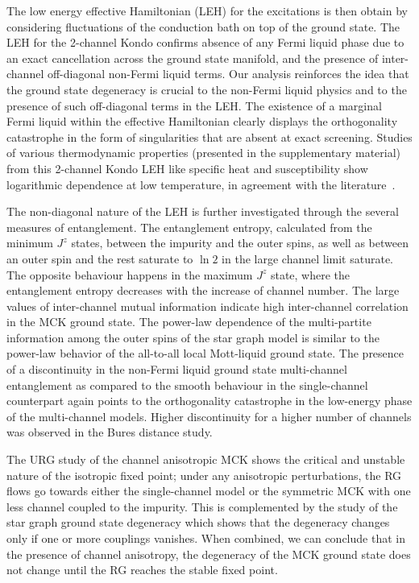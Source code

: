 \documentclass[reprint,prb,superscriptaddress]{revtex4-2}
\begin{document}
\par The low energy effective Hamiltonian (LEH) for the excitations is then obtain by considering fluctuations of the conduction bath on top of the ground state. The LEH for the 2-channel Kondo confirms absence of any Fermi liquid phase due to an exact cancellation across the ground state manifold, and the presence of inter-channel off-diagonal non-Fermi liquid terms. Our analysis reinforces the idea that the ground state degeneracy is crucial to the non-Fermi liquid physics and to the presence of such off-diagonal terms in the LEH.
The existence of a marginal Fermi liquid within the effective Hamiltonian clearly displays the orthogonality catastrophe in the form of singularities that are absent at exact screening.
Studies of various thermodynamic properties (presented in the supplementary material) from this 2-channel Kondo LEH like specific heat and susceptibility show logarithmic dependence at low temperature, in agreement with the literature~\cite{affleck_1991_overscreen,affleck_ludwig_1991,affleck_pang_cox_1992,affleck1993exact,parcollet_olivier_large_N,affleck_2005,emery_kivelson,andrei_destri_1984,Tsvelick1984,Tsvelick_1985,andrei_jerez_1995,zarand_costi_2002}.

\par 
The non-diagonal nature of the LEH is further investigated through the several measures of entanglement.
The entanglement entropy, calculated from the minimum \(J^z\) states, between the impurity and the outer spins, as well as between an outer spin and the rest saturate to \(\ln 2\) in the large channel limit saturate. The opposite behaviour happens in the maximum $J^z$ state, where the entanglement entropy decreases with the increase of channel number.
The large values of inter-channel mutual information indicate high inter-channel correlation in the MCK ground state.
The power-law dependence of the multi-partite information among the outer spins of the star graph model is similar to the power-law behavior of the all-to-all local Mott-liquid ground state.
The presence of a discontinuity in the non-Fermi liquid ground state multi-channel entanglement as compared to the smooth behaviour in the single-channel counterpart again points to the orthogonality catastrophe in the low-energy phase of the multi-channel models.
Higher discontinuity for a higher number of channels was observed in the Bures distance study.

\par The URG study of the channel anisotropic MCK shows the critical and unstable nature of the isotropic fixed point; under any anisotropic perturbations, the RG flows go towards either the single-channel model or the symmetric MCK with one less channel coupled to the impurity.
This is complemented by the study of the star graph ground state degeneracy which shows that the degeneracy changes only if one or more couplings vanishes.
When combined, we can conclude that in the presence of channel anisotropy, the degeneracy of the MCK ground state does not change until the RG reaches the stable fixed point.
\end{document}
